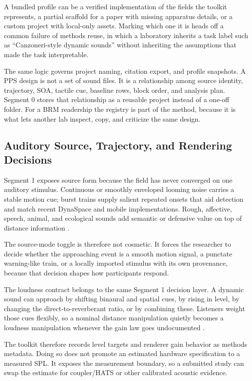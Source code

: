 \documentclass[pdflatex,sn-apa]{sn-jnl}
\begin{document}
A bundled profile can be a verified implementation of the fields the toolkit represents, a partial scaffold for a paper with missing apparatus details, or a custom project with local-only assets. Marking which one it is heads off a common failure of methods reuse, in which a laboratory inherits a task label such as ``Canzoneri-style dynamic sounds'' without inheriting the assumptions that made the task interpretable.

The same logic governs project naming, citation export, and profile snapshots. A PPS design is not a set of sound files. It is a relationship among source identity, trajectory, SOA, tactile cue, baseline rows, block order, and analysis plan. Segment 0 stores that relationship as a reusable project instead of a one-off folder. For a BRM readership the registry is part of the method, because it is what lets another lab inspect, copy, and criticize the same design.

\subsection{Auditory Source, Trajectory, and Rendering Decisions}

Segment 1 exposes source form because the field has never converged on one auditory stimulus. Continuous or smoothly enveloped looming noise carries a stable motion cue; burst trains supply salient repeated onsets that aid detection and match recent DynaSpace and mobile implementations. Rough, affective, speech, animal, and ecological sounds add semantic or defensive value on top of distance information \citep{Taffou2021,Ferri2015,Bahadori2021,Tonelli2019}.

The source-mode toggle is therefore not cosmetic. It forces the researcher to decide whether the approaching event is a smooth motion signal, a punctate warning-like train, or a locally imported stimulus with its own provenance, because that decision shapes how participants respond.

The loudness contract belongs to the same Segment 1 decision layer. A dynamic sound can approach by shifting binaural and spatial cues, by rising in level, by changing the direct-to-reverberant ratio, or by combining these. Listeners weight those cues flexibly, so a nominal distance manipulation quietly becomes a loudness manipulation whenever the gain law goes undocumented \citep{Zahorik2002,Kolarik2015}.

The toolkit therefore records level targets and renderer gain behavior as methods metadata. Doing so does not promote an estimated hardware specification to a measured SPL. It exposes the measurement boundary, so a submitted study can swap the estimate for coupler/HATS or other calibrated acoustic evidence.
\end{document}
